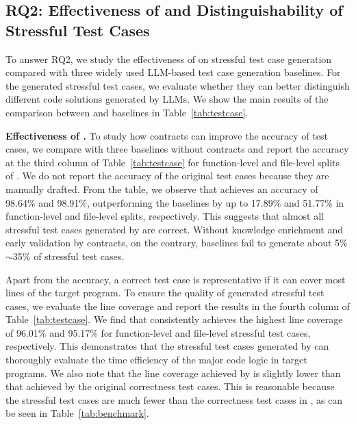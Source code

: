 



\subsection{RQ2: Effectiveness of \tool and Distinguishability of Stressful Test Cases}
To answer RQ2, we study the effectiveness of \tool on stressful test case generation compared with three widely used LLM-based test case generation baselines. For the generated stressful test cases, we evaluate whether they can better distinguish different code solutions generated by LLMs. We show the main results of the comparison between \tool and baselines in Table~\ref{tab:testcase}.



\textbf{Effectiveness of \tool.} To study how contracts can improve the accuracy of test cases, we compare \tool with three baselines without contracts and report the accuracy at the third column of Table~\ref{tab:testcase} for function-level and file-level splits of \bench. We do not report the accuracy of the original test cases because they are manually drafted. From the table, we observe that \tool achieves an accuracy of 98.64\% and 98.91\%, outperforming the baselines by up to 17.89\% and 51.77\% in function-level and file-level splits, respectively. This suggests that almost all stressful test cases generated by \tool are correct. Without knowledge enrichment and early validation by contracts, on the contrary, baselines fail to generate about 5\%$\sim$35\% of stressful test cases. 

Apart from the accuracy, a correct test case is representative if it can cover most lines of the target program. To ensure the quality of generated stressful test cases, we evaluate the line coverage and report the results in the fourth column of Table~\ref{tab:testcase}. We find that \tool consistently achieves the highest line coverage of 96.01\% and 95.17\% for function-level and file-level stressful test cases, respectively. This demonstrates that the stressful test cases generated by \tool can thoroughly evaluate the time efficiency of the major code logic in target programs. We also note that the line coverage achieved by \tool is slightly lower than that achieved by the original correctness test cases. This is reasonable because the stressful test cases are much fewer than the correctness test cases in \bench, as can be seen in Table~\ref{tab:benchmark}.




